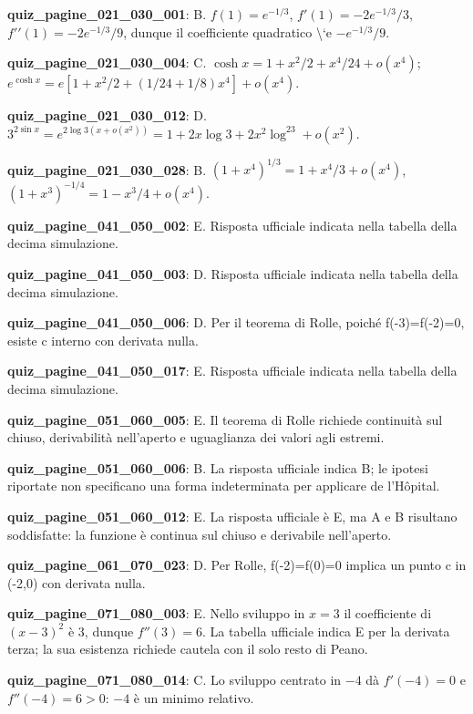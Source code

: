 \documentclass[11pt,a4paper]{article}
\newcounter{quiz}
\begin{document}
\noindent\textbf{quiz\_pagine\_021\_030\_001}: B. $f(1)=e^{-1/3}$, $f\prime(1)=-2e^{-1/3}/3$, $f\prime\prime(1)=-2e^{-1/3}/9$, dunque il coefficiente quadratico \textbackslash{}`e $-e^{-1/3}/9$.\par\medskip
\noindent\textbf{quiz\_pagine\_021\_030\_004}: C. $\cosh x=1+x^2/2+x^4/24+o(x^4)$; $e^{\cosh x}=e[1+x^2/2+(1/24+1/8)x^4]+o(x^4)$.\par\medskip
\noindent\textbf{quiz\_pagine\_021\_030\_012}: D. $3^{2\sin x}=e^{2\log3(x+o(x^2))}=1+2x\log3+2x^2\log^23+o(x^2)$.\par\medskip
\noindent\textbf{quiz\_pagine\_021\_030\_028}: B. $(1+x^4)^{1/3}=1+x^4/3+o(x^4)$, $(1+x^3)^{-1/4}=1-x^3/4+o(x^4)$.\par\medskip
\noindent\textbf{quiz\_pagine\_041\_050\_002}: E. Risposta ufficiale indicata nella tabella della decima simulazione.\par\medskip
\noindent\textbf{quiz\_pagine\_041\_050\_003}: D. Risposta ufficiale indicata nella tabella della decima simulazione.\par\medskip
\noindent\textbf{quiz\_pagine\_041\_050\_006}: D. Per il teorema di Rolle, poiché f(-3)=f(-2)=0, esiste c interno con derivata nulla.\par\medskip
\noindent\textbf{quiz\_pagine\_041\_050\_017}: E. Risposta ufficiale indicata nella tabella della decima simulazione.\par\medskip
\noindent\textbf{quiz\_pagine\_051\_060\_005}: E. Il teorema di Rolle richiede continuità sul chiuso, derivabilità nell’aperto e uguaglianza dei valori agli estremi.\par\medskip
\noindent\textbf{quiz\_pagine\_051\_060\_006}: B. La risposta ufficiale indica B; le ipotesi riportate non specificano una forma indeterminata per applicare de l’Hôpital.\par\medskip
\noindent\textbf{quiz\_pagine\_051\_060\_012}: E. La risposta ufficiale è E, ma A e B risultano soddisfatte: la funzione è continua sul chiuso e derivabile nell’aperto.\par\medskip
\noindent\textbf{quiz\_pagine\_061\_070\_023}: D. Per Rolle, f(-2)=f(0)=0 implica un punto c in (-2,0) con derivata nulla.\par\medskip
\noindent\textbf{quiz\_pagine\_071\_080\_003}: E. Nello sviluppo in $x=3$ il coefficiente di $(x-3)^2$ è $3$, dunque $f''(3)=6$. La tabella ufficiale indica E per la derivata terza; la sua esistenza richiede cautela con il solo resto di Peano.\par\medskip
\noindent\textbf{quiz\_pagine\_071\_080\_014}: C. Lo sviluppo centrato in $-4$ dà $f'(-4)=0$ e $f''(-4)=6>0$: $-4$ è un minimo relativo.\par\medskip
\end{document}
